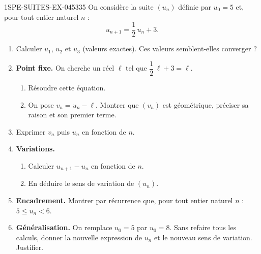 \begin{exercice}{1SPE-SUITES-EX-045}{3}{35}
On considère la suite $(u_n)$ définie par $u_0 = 5$ et, pour tout entier naturel $n$ :
\[
  u_{n+1} = \frac{1}{2}\,u_n + 3.
\]

\begin{enumerate}
  \item Calculer $u_1$, $u_2$ et $u_3$ (valeurs exactes). Ces valeurs semblent-elles converger ?

  \item \textbf{Point fixe.} On cherche un réel $\ell$ tel que $\dfrac{1}{2}\,\ell + 3 = \ell$.
  \begin{enumerate}
    \item Résoudre cette équation.
    \item On pose $v_n = u_n - \ell$. Montrer que $(v_n)$ est géométrique, préciser sa raison et son premier terme.
  \end{enumerate}

  \item Exprimer $v_n$ puis $u_n$ en fonction de $n$.

  \item \textbf{Variations.}
  \begin{enumerate}
    \item Calculer $u_{n+1} - u_n$ en fonction de $n$.
    \item En déduire le sens de variation de $(u_n)$.
  \end{enumerate}

  \item \textbf{Encadrement.} Montrer par récurrence que, pour tout entier naturel $n$ : $5 \leq u_n < 6$.

  \item \textbf{Généralisation.} On remplace $u_0 = 5$ par $u_0 = 8$. Sans refaire tous les calculs, donner la nouvelle expression de $u_n$ et le nouveau sens de variation. Justifier.
\end{enumerate}
\end{exercice}
